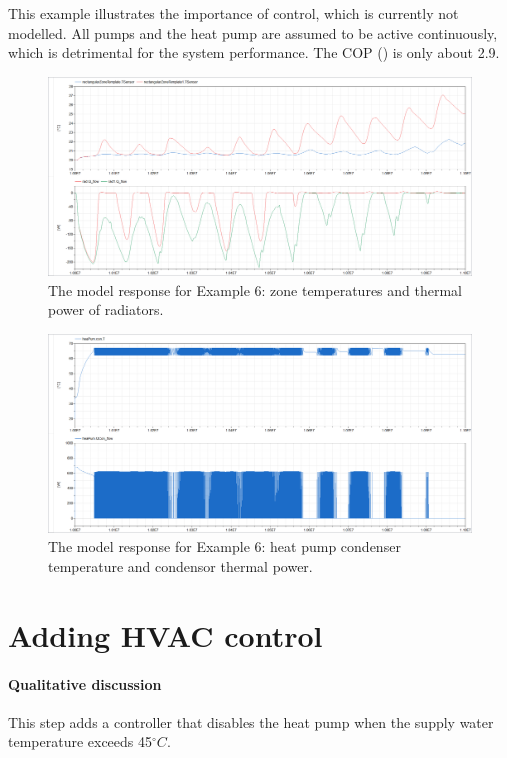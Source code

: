 \documentclass[10pt,a4paper]{article}
\begin{document}
This example illustrates the importance of control, which is currently not modelled.
All pumps and the heat pump are assumed to be active continuously, 
which is detrimental for the system performance.
The COP () is only about 2.9.

\newpage

\begin{figure}[h!]
\centering
\includegraphics[scale=0.28]{Example6.png}
\caption{The model response for Example 6: zone temperatures and thermal power of radiators.}
\label{fig:res1}
\end{figure}

\begin{figure}[h!]
	\centering
	\includegraphics[scale=0.28]{Example6_bis.png}
	\caption{The model response for Example 6: heat pump condenser temperature and condensor thermal power.}
	\label{fig:res1_bis}
\end{figure}

\newpage

\section{Adding HVAC control}
\paragraph{Qualitative discussion}
This step adds a controller that disables the heat pump
when the supply water temperature exceeds 45$^{\circ}C$.
\end{document}
